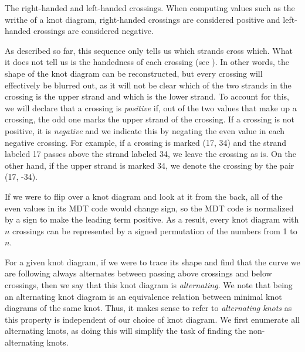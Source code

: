 \begin{paper}
{The right-handed and left-handed crossings.
When computing values such as the writhe of a knot diagram, right-handed
crossings are considered positive and left-handed crossings are considered
negative.}

As described so far, this sequence only tells us which strands cross which.
What it does not tell us is the handedness of each crossing (see \figCrossings).
In other words, the shape of the knot diagram can be reconstructed, but every
crossing will effectively be blurred out, as it will not be clear which of the
two strands in the crossing is the upper strand and which is the lower strand.
To account for this, we will declare that a crossing is \textit{positive} if,
out of the two values that make up a crossing, the odd one marks the upper
strand of the crossing.
If a crossing is not positive, it is \textit{negative} and we indicate this by
negating the even value in each negative crossing.
For example, if a crossing is marked (17, 34) and the strand labeled 17 passes
above the strand labeled 34, we leave the crossing as is.
On the other hand, if the upper strand is marked 34, we denote the crossing by
the pair (17, -34).

If we were to flip over a knot diagram and look at it from the back, all of the
even values in its MDT code would change sign, so the MDT code is normalized by
a sign to make the leading term positive.
As a result, every knot diagram with $n$ crossings can be represented by a
signed permutation of the numbers from 1 to $n$.


For a given knot diagram, if we were to trace its shape and find that the curve
we are following always alternates between passing above crossings and below
crossings, then we say that this knot diagram is \textit{alternating}.
We note that being an alternating knot diagram is an equivalence relation
between minimal knot diagrams of the same knot.
Thus, it makes sense to refer to \textit{alternating knots} as this property is
independent of our choice of knot diagram.
We first enumerate all alternating knots, as doing this will simplify the task
of finding the non-alternating knots.


\end{paper}
